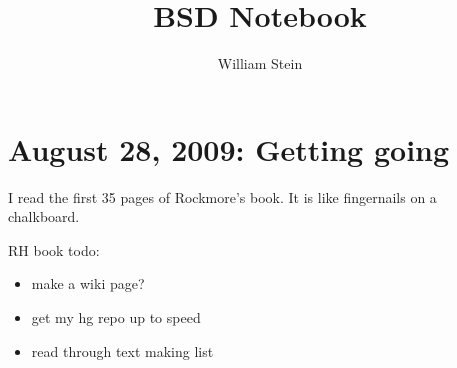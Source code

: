 \documentclass{article}
\title{BSD Notebook}
\author{William Stein}
\date{}
\begin{document}
\maketitle
\tableofcontents

\section{August 28, 2009: Getting going}

I read the first 35 pages of Rockmore's book.  It is like 
fingernails on a chalkboard. 

RH book todo:
\begin{itemize}
 \item make a wiki page?
 \item get my hg repo up to speed
  \item read through text making list
\end{itemize}
\end{document}

